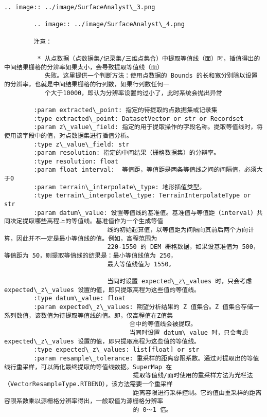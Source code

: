 \documentclass[11pt]{article}
\begin{document}
\begin{Verbatim}[commandchars=\\\{\}]
        .. image:: ../image/SurfaceAnalyst\_3.png
        
        .. image:: ../image/SurfaceAnalyst\_4.png
        
        注意：
        
         * 从点数据（点数据集/记录集/三维点集合）中提取等值线（面）时，插值得出的中间结果栅格的分辨率如果太小，会导致提取等值线（面）
           失败。这里提供一个判断方法：使用点数据的 Bounds 的长和宽分别除以设置的分辨率，也就是中间结果栅格的行列数，如果行列数任何一
           个大于10000，即认为分辨率设置的过小了，此时系统会抛出异常
        
        :param extracted\_point: 指定的待提取的点数据集或记录集
        :type extracted\_point: DatasetVector or str or Recordset
        :param z\_value\_field: 指定的用于提取操作的字段名称。提取等值线时，将使用该字段中的值，对点数据集进行插值分析。
        :type z\_value\_field: str
        :param resolution: 指定的中间结果（栅格数据集）的分辨率。
        :type resolution: float
        :param float interval:  等值距，等值距是两条等值线之间的间隔值，必须大于0
        :param terrain\_interpolate\_type: 地形插值类型。
        :type terrain\_interpolate\_type: TerrainInterpolateType or str
        :param datum\_value: 设置等值线的基准值。基准值与等值距（interval）共同决定提取哪些高程上的等值线。基准值作为一个生成等值
                            线的初始起算值，以等值距为间隔向其前后两个方向计算，因此并不一定是最小等值线的值。例如，高程范围为
                            220-1550 的 DEM 栅格数据，如果设基准值为 500，等值距为 50，则提取等值线的结果是：最小等值线值为 250，
                            最大等值线值为 1550。
        
                            当同时设置 expected\_z\_values 时，只会考虑 expected\_z\_values 设置的值，即只提取高程为这些值的等值线。
        :type datum\_value: float
        :param expected\_z\_values: 期望分析结果的 Z 值集合。Z 值集合存储一系列数值，该数值为待提取等值线的值。即，仅高程值在Z值集
                                  合中的等值线会被提取。
                                  当同时设置 datum\_value 时，只会考虑 expected\_z\_values 设置的值，即只提取高程为这些值的等值线。
        :type expected\_z\_values: list[float] or str
        :param resample\_tolerance: 重采样的距离容限系数。通过对提取出的等值线行重采样，可以简化最终提取的等值线数据。SuperMap 在
                                   提取等值线/面时使用的重采样方法为光栏法（VectorResampleType.RTBEND），该方法需要一个重采样
                                   距离容限进行采样控制。它的值由重采样的距离容限系数乘以源栅格分辨率得出，一般取值为源栅格分辨率
                                   的 0～1 倍。
        

\end{Verbatim}
\end{document}
